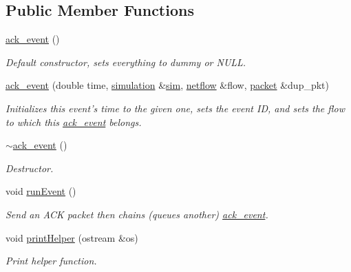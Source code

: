 \subsection*{Public Member Functions}
\begin{DoxyCompactItemize}
\item 
\hyperlink{classack__event_ad3ac242accdc6db4f37da57a28e7f120}{ack\-\_\-event} ()
\begin{DoxyCompactList}\small\item\em Default constructor, sets everything to dummy or N\-U\-L\-L. \end{DoxyCompactList}\item 
\hypertarget{classack__event_a5a1e4cc597de2f0fda0a454a47544ef6}{\hyperlink{classack__event_a5a1e4cc597de2f0fda0a454a47544ef6}{ack\-\_\-event} (double time, \hyperlink{classsimulation}{simulation} \&\hyperlink{classevent_a08c6d828bfb6f5539dcd1491e8ac77d2}{sim}, \hyperlink{classnetflow}{netflow} \&flow, \hyperlink{classpacket}{packet} \&dup\-\_\-pkt)}\label{classack__event_a5a1e4cc597de2f0fda0a454a47544ef6}

\begin{DoxyCompactList}\small\item\em Initializes this event's time to the given one, sets the event I\-D, and sets the flow to which this \hyperlink{classack__event}{ack\-\_\-event} belongs. \end{DoxyCompactList}\item 
\hyperlink{classack__event_aa5e993d447f4d3bccc2559af3526a138}{$\sim$ack\-\_\-event} ()
\begin{DoxyCompactList}\small\item\em Destructor. \end{DoxyCompactList}\item 
\hypertarget{classack__event_a7c56c7da987f6092c855d27a114e9b33}{void \hyperlink{classack__event_a7c56c7da987f6092c855d27a114e9b33}{run\-Event} ()}\label{classack__event_a7c56c7da987f6092c855d27a114e9b33}

\begin{DoxyCompactList}\small\item\em Send an A\-C\-K packet then chains (queues another) \hyperlink{classack__event}{ack\-\_\-event}. \end{DoxyCompactList}\item 
void \hyperlink{classack__event_a56be0eef82f482ebb0d63277ae9429de}{print\-Helper} (ostream \&os)
\begin{DoxyCompactList}\small\item\em Print helper function. \end{DoxyCompactList}\end{DoxyCompactItemize}

